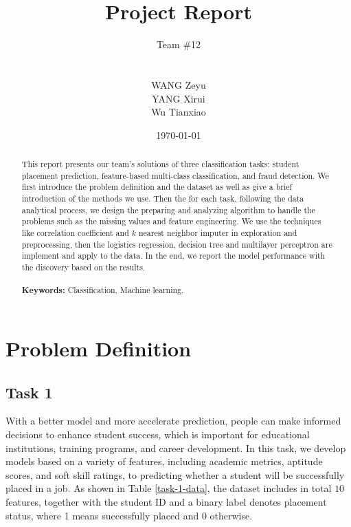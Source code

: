 \documentclass[11pt]{article}
\title{\Huge Project Report}
\author{
  \parbox{\textwidth}{
    \vspace{0.5cm}
    \centering \LARGE Team \#12
    \vspace{0.5cm}
  } \\
  \parbox{0.2\textwidth}{
    \centering WANG Zeyu
  }
  \parbox{0.2\textwidth}{
    \centering YANG Xirui
  }
  \parbox{0.2\textwidth}{
    \centering Wu Tianxiao
  }
}
\date{\today}
\begin{document}
\maketitle
\thispagestyle{empty}
\setcounter{page}{0}

\vspace{1cm}

\begin{abstract}
  This report presents our team's solutions of three classification tasks: student placement prediction, feature-based multi-class classification, and fraud detection. We first introduce the problem definition and the dataset as well as give a brief introduction of the methods we use. Then the for each task, following the data analytical process, we design the preparing and analyzing algorithm to handle the problems such as the missing values and feature engineering. We use the techniques like correlation coefficient and $k$ nearest neighbor imputer in exploration and preprocessing, then the logistics regression, decision tree and multilayer perceptron are implement and apply to the data. In the end, we report the model performance with the discovery based on the results.
  \\\\
  \textbf{Keywords:} Classification, Machine learning.
\end{abstract}

\newpage

\section{Problem Definition}

\subsection{Task 1}

With a better model and more accelerate prediction, people can make informed decisions to enhance student success, which is important for educational institutions, training programs, and career development. In this task, we develop models based on a variety of features, including academic metrics, aptitude scores, and soft skill ratings, to predicting whether a student will be successfully placed in a job. As shown in Table \ref{task-1-data}, the dataset includes in total $10$ features, together with the student ID and a binary label denotes placement status, where 1 means successfully placed and 0 otherwise.
\end{document}
